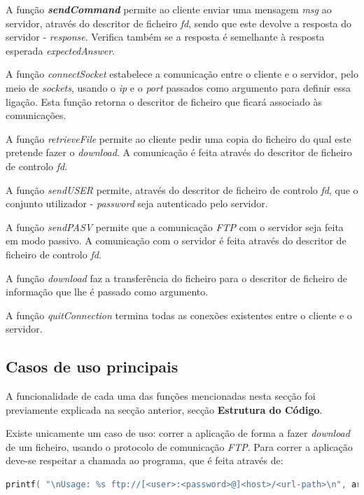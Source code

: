 \documentclass[a4paper, 11pt]{article}
\begin{document}
A função \textbf{\textit{sendCommand}} permite ao cliente enviar uma mensagem \textit{msg} ao servidor, através do descritor de ficheiro \textit{fd}, sendo que este devolve a resposta do servidor - \textit{response}. Verifica também se a resposta é semelhante à resposta esperada \textit{expectedAnswer}.

A função \textit{connectSocket} estabelece a comunicação entre o cliente e o servidor, pelo meio de \textit{sockets}, usando o \textit{ip} e o \textit{port} passados como argumento para definir essa ligação. Esta função retorna o descritor de ficheiro que ficará associado às comunicações.

A função \textit{retrieveFile} permite ao cliente pedir uma copia do ficheiro do qual este pretende fazer o \textit{download}. A comunicação é feita através do descritor de ficheiro de controlo \textit{fd}.

A função \textit{sendUSER} permite, através do descritor de ficheiro de controlo \textit{fd}, que o conjunto utilizador - \textit{password} seja autenticado pelo servidor.

A função \textit{sendPASV} permite que a comunicação \textit{FTP} com o servidor seja feita em modo passivo. A comunicação com o servidor é feita através do descritor de ficheiro de controlo \textit{fd}.

A função \textit{download} faz a transferência do ficheiro para o descritor de ficheiro de informação que lhe é passado como argumento.

A função \textit{quitConnection} termina todas as conexões existentes entre o cliente e o servidor.

\subsection{Casos de uso principais}

A funcionalidade de cada uma das funções mencionadas nesta secção foi previamente explicada na secção anterior, secção \textbf{Estrutura do Código}.

Existe unicamente um caso de uso: correr a aplicação de forma a fazer \textit{download} de um ficheiro, usando o protocolo de comunicação \textit{FTP}. Para correr a aplicação deve-se respeitar a chamada ao programa, que é feita através de:

\begin{lstlisting}[language=C]
printf( "\nUsage: %s ftp://[<user>:<password>@]<host>/<url-path>\n", argv[0]);
\end{lstlisting}
\end{document}
